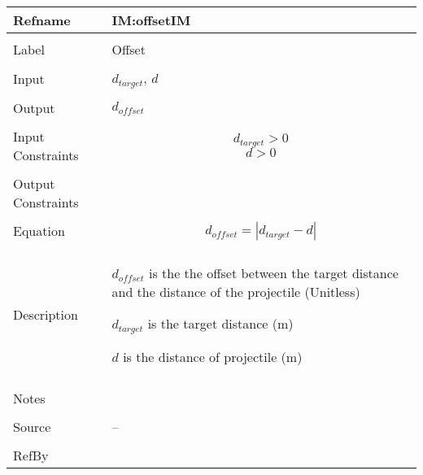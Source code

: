 \documentclass[12pt]{article}
\begin{document}
\noindent \begin{minipage}{\textwidth}
\begin{tabular}{p{} p{}}
\toprule \textbf{Refname} & \textbf{IM:offsetIM}
\label{IM:offsetIM}
\\ \midrule \\
Label & Offset
\\ \midrule \\
Input & ${d_{target}}$, $d$
\\ \midrule \\
Output & ${d_{offset}}$
\\ \midrule \\
Input Constraints & \begin{displaymath}
                    {d_{target}}>0
                    \end{displaymath}
                    \begin{displaymath}
                    d>0
                    \end{displaymath}
\\ \midrule \\
Output Constraints & 
\\ \midrule \\
Equation & \begin{displaymath}
           {d_{offset}}=|{d_{target}}-d|
           \end{displaymath}
\\ \midrule \\
Description & \begin{symbDescription}
              \item{${d_{offset}}$ is the the offset between the target distance and the distance of the projectile (Unitless)}
              \item{${d_{target}}$ is the target distance (m)}
              \item{$d$ is the distance of projectile (m)}
              \end{symbDescription}
\\ \midrule \\
Notes & 
\\ \midrule \\
Source & --
\\ \midrule \\
RefBy & 
\\ \bottomrule \end{tabular}
\end{minipage}
\par~
\end{document}
